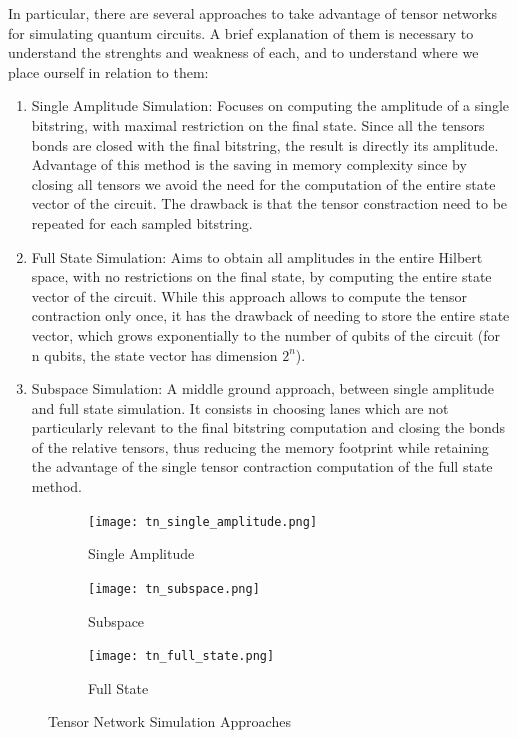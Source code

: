 \documentclass[12pt,oneside,a4paper]{article}
\begin{document}
In particular, there are several approaches to take advantage of tensor networks for simulating quantum circuits. A brief explanation of them is necessary to understand the strenghts and weakness of each, and to understand where we place ourself in relation to them:
\begin{enumerate}
    \item Single Amplitude Simulation: Focuses on computing the amplitude of a single bitstring, with maximal restriction on the final state. Since all the tensors bonds are closed with the final bitstring, the result is directly its amplitude. Advantage of this method is the saving in memory complexity since by closing all tensors we avoid the need for the computation of the entire state vector of the circuit. The drawback is that the tensor constraction need to be repeated for each sampled bitstring.
    \item Full State Simulation: Aims to obtain all amplitudes in the entire Hilbert space, with no restrictions on the final state, by computing the entire state vector of the circuit. While this approach allows to compute the tensor contraction only once, it has the drawback of needing to store the entire state vector, which grows exponentially to the number of qubits of the circuit (for n qubits, the state vector has dimension $2^n$).
    \item Subspace Simulation: A middle ground approach, between single amplitude and full state simulation. It consists in choosing lanes which are not particularly relevant to the final bitstring computation and closing the bonds of the relative tensors, thus reducing the memory footprint while retaining the advantage of the single tensor contraction computation of the full state method.
\end{enumerate}

\newpage

\begin{figure}[h]
    \centering
    \begin{subfigure}[b]{0.3\textwidth}
    \texttt{[image: tn\_single\_amplitude.png]}
    \caption{Single Amplitude\footnotemark[1]}
    \end{subfigure}
    \hfill
    \begin{subfigure}[b]{0.3\textwidth}
    \texttt{[image: tn\_subspace.png]}
    \caption{Subspace\footnotemark[2]}
    \end{subfigure}
    \hfill
    \begin{subfigure}[b]{0.3\textwidth}
    \texttt{[image: tn\_full\_state.png]}
    \caption{Full State\footnotemark[3]}
    \end{subfigure}
    \caption{Tensor Network Simulation Approaches}
\end{figure}
\end{document}
